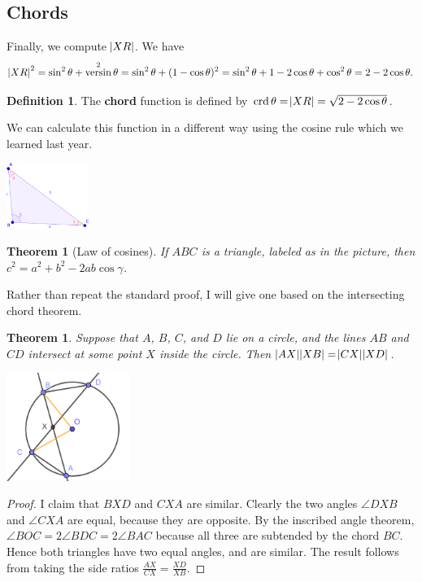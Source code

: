 \documentclass[a4paper,leqno]{article}
\numberwithin{equation}{section}
\newtheorem{thm}[equation]{Theorem}
\theoremstyle{definition}
\newtheorem{defn}[equation]{Definition}
\theoremstyle{remark}
\newcommand{\df}[1]{\textbf{#1}}
\DeclareMathOperator{\versin}{versin}
\DeclareMathOperator{\crd}{crd}
\begin{document}
\subsection{Chords}
Finally, we compute $ \abs{XR} $. We have
\begin{displaymath}
  \abs{XR}^2 = \sin^2 \theta + \versin^2 \theta = \sin^2 \theta + (1 - \cos \theta)^2 = \sin^2 \theta + 1 - 2\cos \theta + \cos^2 \theta = 2 - 2\cos \theta.
\end{displaymath}

\begin{defn}
  The \df{chord} function is defined by $ \crd \theta = \abs{XR} = \sqrt{2 - 2\cos \theta} $.
\end{defn}

We can calculate this function in a different way using the cosine rule which we learned last year.

\begin{center}
  \includegraphics[width=0.2\textwidth]{trisines}
\end{center}

\begin{thm}[Law of cosines]
  If $ ABC $ is a triangle, labeled as in the picture, then $ c^2 = a^2 + b^2 - 2ab \cos \gamma $.
\end{thm}

Rather than repeat the standard proof, I will give one based on the intersecting chord theorem.
\begin{thm}
  Suppose that $ A $, $ B $, $ C $, and $ D $ lie on a circle, and the lines $ AB $ and $ CD $ intersect at
  some point $ X $ inside the circle. Then $ \abs{AX} \abs{XB} = \abs{CX} \abs{XD} $.
\end{thm}
\begin{center}
  \includegraphics[width=0.3\textwidth]{ichords}
\end{center}
\begin{proof}
  I claim that $ BXD $ and $ CXA $ are similar. Clearly the two angles $ \angle DXB $ and $ \angle CXA $ are
  equal, because they are opposite. By the inscribed angle theorem, $ \angle BOC = 2\angle BDC = 2\angle BAC $
  because all three are subtended by the chord $ BC $. Hence both triangles have two equal angles, and are similar.
  The result follows from taking the side ratios $ \frac{AX}{CX} = \frac{XD}{XB} $.
\end{proof}
\end{document}
